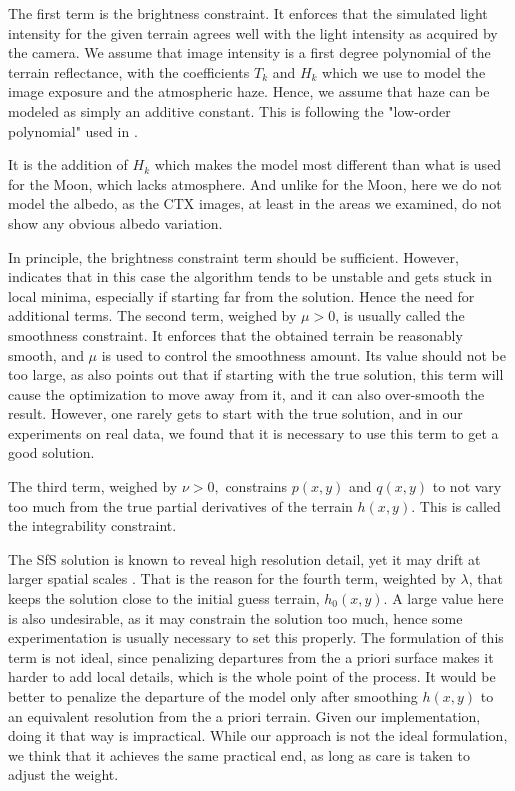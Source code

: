 \documentclass[draft,linenumbers]{agujournal}
\begin{document}
The first term is the brightness constraint. It enforces that the
simulated light intensity for the given terrain agrees well with
the light intensity as acquired by the camera. We assume that
image intensity is a first degree polynomial of the terrain reflectance,
with the coefficients $T_k$ and $H_k$ which we use to model the image exposure and
the atmospheric haze. Hence, we assume that haze can be modeled as simply an additive constant. 
This is following the "low-order polynomial" used in \citep{wohlfarth2018high}. 

It is the addition of $H_k$ which makes the model most different than what is used for the Moon,
which lacks atmosphere. And unlike for the Moon, here we do not model the albedo, 
as the CTX images, at least in the areas we examined, do not show any obvious albedo variation. 

In principle, the brightness constraint term should be sufficient. However,
\citet{horn1990height} indicates that in this case the algorithm
tends to be unstable and gets stuck in local minima, especially if
starting far from the solution. Hence the need for additional terms. 
The second term, weighed by $\mu > 0$, is usually called the smoothness constraint. It
enforces that the obtained terrain be reasonably smooth, and 
$\mu$ is used to control the smoothness amount. Its value should not be too large, as \citet{horn1990height}
also points out that if starting with the true solution, this term
will cause the optimization to move away from it, and it can also
over-smooth the result. However, one rarely gets to start with the
true solution, and in our experiments on real data, we 
found that it is necessary to use this term to get a good solution.

The third term, weighed by $\nu > 0,$ constrains $p(x, y)$ and $q(x,y)$ to not vary too much from
the true partial derivatives of the terrain $h(x, y).$ 
This is called the integrability constraint.

The SfS solution is known to reveal high resolution detail, yet it
may drift at larger spatial scales \citep{grumpe2014construction}.
That is the reason for the fourth term, weighted by $\lambda$, that
keeps the solution close to the initial guess terrain, $h_0(x, y)$. A
large value here is also undesirable, as it may constrain the
solution too much, hence some experimentation is usually necessary
to set this properly. The formulation of this term is not ideal, 
since penalizing departures from the a priori surface makes it harder to add local
details, which is the whole point of the process.  It would be better to penalize
the departure of the model only after smoothing $h(x, y)$ to an equivalent resolution from
the a priori terrain.  Given our implementation, doing it that way is impractical.  
While our approach is not the ideal formulation, we think that it achieves the same 
practical end, as long as care is taken to adjust the weight.
\end{document}

